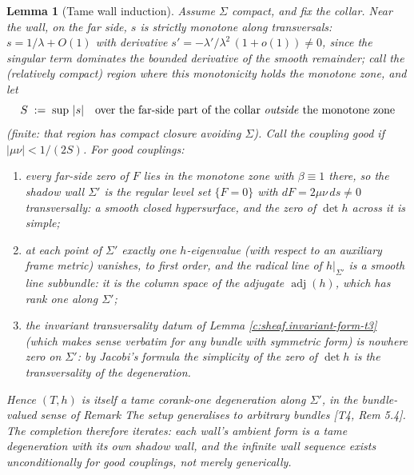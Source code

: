 \documentclass[11pt]{article}
\newtheorem{lemma}[theorem]{Lemma}
\theoremstyle{definition}
\theoremstyle{plain}
\providecommand{\Sig}{}\renewcommand{\Sig}{\Sigma}
\begin{document}
\begin{lemma}[Tame wall induction]\label{c:sheaf.tame-wall-induction}
Assume $\Sig$ compact, and fix the collar. Near the wall, on the far side, $s$ is strictly monotone along transversals: $s = 1/\lambda + O(1)$ with derivative $s' = -\lambda'/\lambda^2\,(1 + o(1)) \neq 0$, since the singular term dominates the bounded derivative of the smooth remainder; call the (relatively compact) region where this monotonicity holds the \emph{monotone zone}, and let
\[
S \;:=\; \sup\,|s| \quad\text{over the far-side part of the collar \emph{outside} the monotone zone}
\]
(finite: that region has compact closure avoiding $\Sig$). Call the coupling \emph{good} if $|\mu\nu| < 1/(2S)$. For good couplings:
\begin{enumerate}
\item every far-side zero of $F$ lies in the monotone zone with $\beta \equiv 1$ there, so the shadow wall $\Sig'$ is the regular level set $\{F = 0\}$ with $dF = 2\mu\nu\,ds \neq 0$ transversally: a smooth closed hypersurface, and the zero of $\det h$ across it is simple;
\item at each point of $\Sig'$ exactly one $h$-eigenvalue (with respect to an auxiliary frame metric) vanishes, to first order, and the radical line of $h|_{\Sig'}$ is a smooth line subbundle: it is the column space of the adjugate $\operatorname{adj}(h)$, which has rank one along $\Sig'$;
\item the invariant transversality datum of Lemma \ref{c:sheaf.invariant-form-t3} (which makes sense verbatim for any bundle with symmetric form) is nowhere zero on $\Sig'$: by Jacobi's formula the simplicity of the zero of $\det h$ \emph{is} the transversality of the degeneration.
\end{enumerate}
Hence $(T, h)$ is itself a tame corank-one degeneration along $\Sig'$, in the bundle-valued sense of Remark \emph{The setup generalises to arbitrary bundles} [T4, Rem 5.4]. The completion therefore iterates: each wall's ambient form is a tame degeneration with its own shadow wall, and the infinite wall sequence exists unconditionally for good couplings, not merely generically.
\end{lemma}
\end{document}
